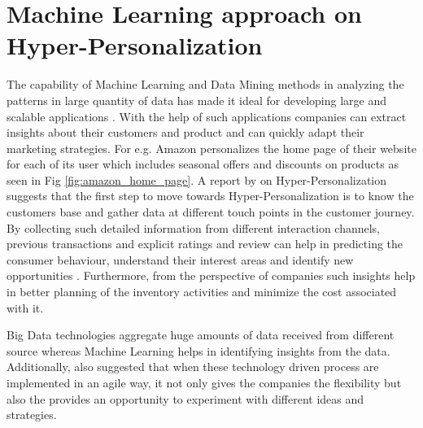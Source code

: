 \section{Machine Learning approach on Hyper-Personalization}
The capability of Machine Learning and Data Mining methods in analyzing the patterns in large quantity of data has made it ideal for developing large and scalable applications \autocite[2]{Sodhi}. With the help of such applications companies can extract insights about their customers and product and can quickly adapt their marketing strategies. For e.g. Amazon personalizes the home page of their website for each of its user which includes seasonal offers and discounts on products as seen in Fig \ref{fig:amazon_home_page}. A report by \textcite[20]{DHL2019} on Hyper-Personalization suggests that the first step to move towards Hyper-Personalization is to know the customers base and gather data at different touch points in the customer journey. By collecting such detailed information from different interaction channels, previous transactions and explicit ratings and review can help in predicting the consumer behaviour, understand their interest areas and identify new opportunities \autocite[20]{DHL2019}. Furthermore, from the perspective of companies such insights help in better planning of the inventory activities and minimize the cost associated with it. \\ 
\par
 Big Data technologies aggregate huge amounts of data received from different source whereas Machine Learning helps in identifying insights from the data. Additionally, \textcite[2]{Sodhi} also suggested that when these technology driven process are implemented in an agile way, it not only gives the companies the flexibility but also the provides an opportunity to experiment with different ideas and strategies. \\
\par
